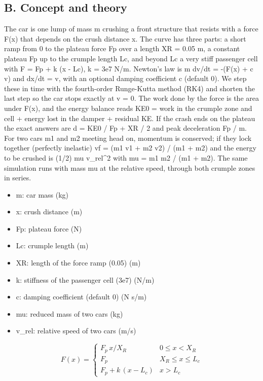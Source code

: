 \documentclass[11pt,a4paper]{article}
\begin{document}
\subsection*{B. Concept and theory}
The car is one lump of mass m crushing a front structure that resists with a force F(x) that depends on the crush distance x. The curve has three parts: a short ramp from 0 to the plateau force Fp over a length XR = 0.05 m, a constant plateau Fp up to the crumple length Lc, and beyond Lc a very stiff passenger cell with F = Fp + k (x - Lc), k = 3e7 N/m. Newton's law is m dv/dt = -(F(x) + c v) and dx/dt = v, with an optional damping coefficient c (default 0). We step these in time with the fourth-order Runge-Kutta method (RK4) and shorten the last step so the car stops exactly at v = 0. The work done by the force is the area under F(x), and the energy balance reads KE0 = work in the crumple zone and cell + energy lost in the damper + residual KE. If the crash ends on the plateau the exact answers are d = KE0 / Fp + XR / 2 and peak deceleration Fp / m. For two cars m1 and m2 meeting head on, momentum is conserved; if they lock together (perfectly inelastic) vf = (m1 v1 + m2 v2) / (m1 + m2) and the energy to be crushed is (1/2) mu v\_rel\textasciicircum{}2 with mu = m1 m2 / (m1 + m2). The same simulation runs with mass mu at the relative speed, through both crumple zones in series.

\begin{itemize}[nosep]
\item m: car mass (kg)
\item x: crush distance (m)
\item Fp: plateau force (N)
\item Lc: crumple length (m)
\item XR: length of the force ramp (0.05) (m)
\item k: stiffness of the passenger cell (3e7) (N/m)
\item c: damping coefficient (default 0) (N s/m)
\item mu: reduced mass of two cars (kg)
\item v\_rel: relative speed of two cars (m/s)
\end{itemize}

\begin{equation*}
F(x)=\begin{cases}F_p\,x/X_R & 0\le x<X_R\\ F_p & X_R\le x\le L_c\\ F_p+k\,(x-L_c) & x>L_c\end{cases}
\end{equation*}
\end{document}
